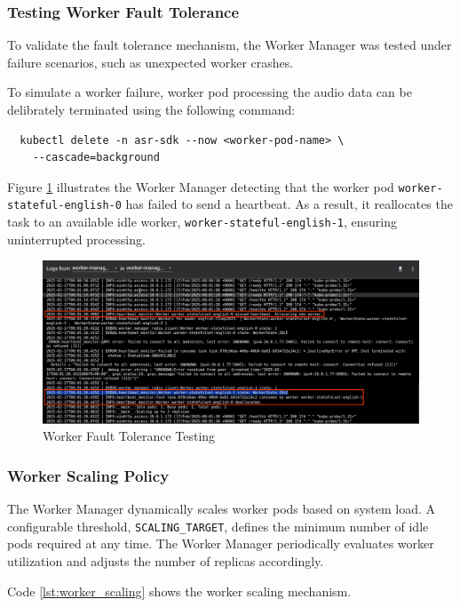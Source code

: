 \subsubsection{Testing Worker Fault Tolerance}
To validate the fault tolerance mechanism, the Worker Manager was tested under failure scenarios, such as unexpected worker crashes.

To simulate a worker failure, worker pod processing the audio data can be delibrately terminated using the following command:
\begin{verbatim}
  kubectl delete -n asr-sdk --now <worker-pod-name> \
    --cascade=background
\end{verbatim}

Figure \ref{fig:worker_fault_tolerance} illustrates the Worker Manager detecting that the worker pod \texttt{worker-\allowbreak stateful-english-0} has failed to send a heartbeat. As a result, it reallocates the task to an available idle worker, \texttt{worker-stateful-english-1}, ensuring uninterrupted processing.

\begin{figure}[H]
  \centering
  \includegraphics[width=\textwidth]{figures/worker_fault_tolerance.png}
  \caption{Worker Fault Tolerance Testing}
  \label{fig:worker_fault_tolerance}
\end{figure}

\subsubsection{Worker Scaling Policy}
The Worker Manager dynamically scales worker pods based on system load. A configurable threshold, \texttt{SCALING\_TARGET}, defines the minimum number of idle pods required at any time. The Worker Manager periodically evaluates worker utilization and adjusts the number of replicas accordingly. 

Code \ref{lst:worker_scaling} shows the worker scaling mechanism.

